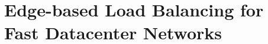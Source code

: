 \chapter{Edge-based Load Balancing for Fast Datacenter Networks}
\label{thesis:chapter:presto}







%
%

